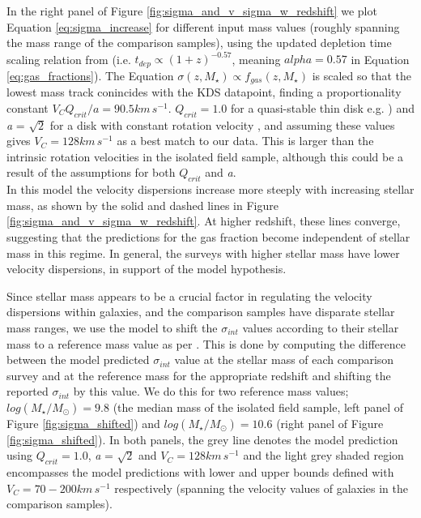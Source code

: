 \documentclass[fleqn,usenatbib]{mnras}
\begin{document}
In the right panel of Figure \ref{fig:sigma_and_v_sigma_w_redshift} we plot Equation \ref{eq:sigma_increase} for different input mass values (roughly spanning the mass range of the comparison samples), using the updated depletion time scaling relation from \cite{Tacconi2017} (i.e. $t_{dep} \propto (1 + z)^{-0.57}$, meaning $alpha=0.57$ in Equation \ref{eq:gas_fractions}).
The Equation $\sigma(z,M_{\star})\propto f_{gas}(z,M_{\star})$ is scaled so that the lowest mass track conincides with the KDS datapoint, finding a proportionality constant $V_{C}Q_{crit}/a = 90.5km\,s^{-1}$.
$Q_{crit} = 1.0$ for a quasi-stable thin disk e.g. \citealt{ForsterSchreiber2006,Burkert2010}) and {\it a} = $\sqrt{2}$ for a disk with constant rotation velocity \citep{Wisnioski2015}, and assuming these values gives $V_{C} = 128km\,s^{-1}$ as a best match to our data.
This is larger than the intrinsic rotation velocities in the isolated field sample, although this could be a result of the assumptions for both $Q_{crit}$ and {\it a}. \\

\noindent
In this model the velocity dispersions increase more steeply with increasing stellar mass, as shown by the solid and dashed lines in Figure \ref{fig:sigma_and_v_sigma_w_redshift}.
At higher redshift, these lines converge, suggesting that the predictions for the gas fraction become independent of stellar mass in this regime.
In general, the surveys with higher stellar mass have lower velocity dispersions, in support of the model hypothesis.

Since stellar mass appears to be a crucial factor in regulating the velocity dispersions within galaxies, and the comparison samples have disparate stellar mass ranges, we use the model to shift the $\sigma_{int}$ values according to their stellar mass to a reference mass value as per \cite{Wisnioski2015}.
This is done by computing the difference between the model predicted $\sigma_{int}$ value at the stellar mass of each comparison survey and at the reference mass for the appropriate redshift and shifting the reported $\sigma_{int}$ by this value.
We do this for two reference mass values; $log(M_{\star}/M_{\odot}) = 9.8$ (the median mass of the isolated field sample, left panel of Figure \ref{fig:sigma_shifted}) and $log(M_{\star}/M_{\odot}) = 10.6$ (right panel of Figure \ref{fig:sigma_shifted}).
In both panels, the grey line denotes the model prediction using $Q_{crit} = 1.0$, {\it a} = $\sqrt{2}$ and $V_{C} = 128km\,s^{-1}$ and the light grey shaded region encompasses the model predictions with lower and upper bounds defined with $V_{C} = 70-200km\,s^{-1}$ respectively (spanning the velocity values of galaxies in the comparison samples). \\
\end{document}
